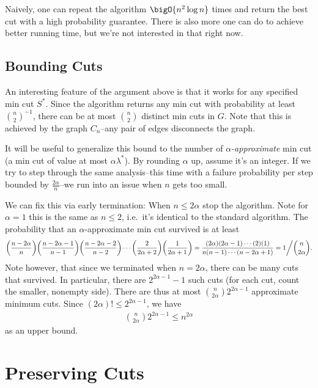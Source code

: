 \documentclass[12pt]{article}
\begin{document}
Naively, one can repeat the algorithm $\bigO{n^2\log n}$ times and return the
best cut with a high probability guarantee. There is also more one can do to
achieve better running time, but we're not interested in that right now.

\subsection{Bounding Cuts}

An interesting feature of the argument above is that it works for any specified
min cut $S^*$. Since the algorithm returns any min cut with probability at least
$\binom{n}{2}^{-1}$, there can be at most $\binom{n}{2}$ distinct min cuts in
$G$. Note that this is achieved by the graph $C_n$--any pair of edges
disconnects the graph.

It will be useful to generalize this bound to the number of
\emph{$\alpha$-approximate} min cut (a min cut of value at most
$\alpha\lambda^*$). By rounding $\alpha$ up, assume it's an integer. If we try
to step through the same analysis--this time with a failure probability per step
bounded by $\frac{2\alpha}{n}$--we run into an issue when $n$ gets too small.

We can fix this via early termination: When $n \leq 2\alpha$ stop the algorithm.
Note for $\alpha = 1$ this is the same as $n \leq 2$, i.e.\ it's identical to
the standard algorithm. The probability that an $\alpha$-approximate min cut
survived is at least
\begin{align*}
  \prac{n - 2\alpha}{n}\prac{n - 2\alpha - 1}{n - 1}\prac{n - 2\alpha - 2}{n - 2}\cdots\prac{2}{2\alpha + 2}\prac{1}{2\alpha + 1}
  = \frac{(2\alpha)(2\alpha - 1)\cdots(2)(1)}{n(n - 1)\cdots(n - 2\alpha + 1)}
  = 1\bigg/\binom{n}{2\alpha}.
\end{align*}
Note however, that since we terminated when $n = 2\alpha$, there can be many
cuts that survived. In particular, there are $2^{2\alpha-1} - 1$ such cuts (for
each cut, count the smaller, nonempty side). There are thus at most
$\binom{n}{2\alpha}2^{2\alpha-1}$ approximate minimum cuts. Since
$(2\alpha)! \leq 2^{2\alpha-1}$, we have
\begin{align*}
  \binom{n}{2\alpha}2^{2\alpha-1} \leq n^{2\alpha}
\end{align*}
as an upper bound.

\section{Preserving Cuts}
\end{document}
